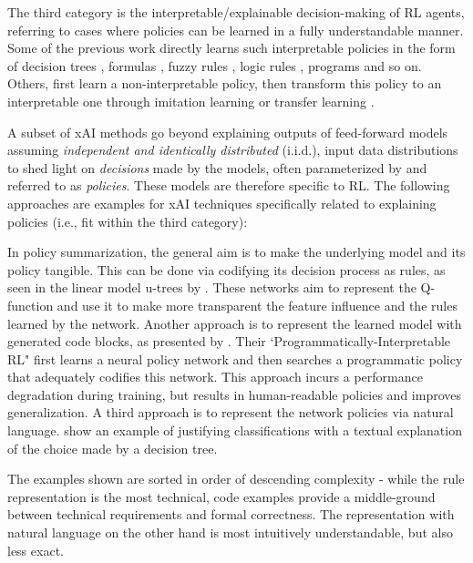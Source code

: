 \documentclass[twoside,11pt]{article}
\begin{document}
The third category is the interpretable/explainable decision-making of RL agents, referring to cases where policies can be learned in a fully understandable manner. Some of the previous work directly learns such interpretable policies in the form of decision trees \citep{likmeta2020combining,silva2020optimization,topin2021iterative}, formulas \citep{hein2018interpretable,hein2019generating}, fuzzy rules \citep{zhang2021kogun,akrour2019towards,hein2017particle}, logic rules \citep{jiang2019neural}, programs \citep{verma2019imitation,sun2019program} and so on. Others, first learn a non-interpretable policy, then transform this policy to an interpretable one through imitation learning or transfer learning \citep{VermaEtAl:2018:ProgrammaticallyInterpretableRL,bastani2018verifiable}.

A subset of xAI methods go beyond explaining outputs of feed-forward models assuming \emph{independent and identically distributed} (i.i.d.), input data distributions to shed light on \emph{decisions} made by the models, often parameterized by and referred to as \emph{policies}. These models are therefore specific to RL. The following approaches are examples for xAI techniques specifically related to explaining policies (i.e., fit within the third category): 

In policy summarization, the general aim is to make the underlying model and its policy tangible. This can be done via codifying its decision process as rules, as seen in the linear model u-trees by \citet{LiuEtAl:2018:LinearModelUTrees}. These networks aim to represent the Q-function and use it to make more transparent the feature influence and the rules learned by the network. 
Another approach is to represent the learned model with generated code blocks, as presented by \citet{VermaEtAl:2018:ProgrammaticallyInterpretableRL}. Their `Programmatically-Interpretable RL" first learns a neural policy network and then searches a programmatic policy that adequately codifies this network. This approach incurs a performance degradation during training, but results in human-readable policies and improves generalization.
A third approach is to represent the network policies via natural language. \citet{AlonsoEtAl:2018:xAINLBeerClassifier} show an example of justifying classifications with a textual explanation of the choice made by a decision tree. 

The examples shown are sorted in order of descending complexity - while the rule representation is the most technical, code examples provide a middle-ground between technical requirements and formal correctness. The representation with natural language on the other hand is most intuitively understandable, but also less exact.
\end{document}
